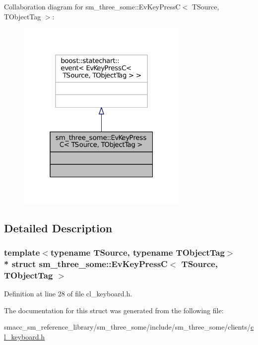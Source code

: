 Collaboration diagram for sm\+\_\+three\+\_\+some\+:\+:Ev\+Key\+PressC$<$ T\+Source, T\+Object\+Tag $>$\+:
\nopagebreak
\begin{figure}[H]
\begin{center}
\leavevmode
\includegraphics[width=235pt]{structsm__three__some_1_1EvKeyPressC__coll__graph}
\end{center}
\end{figure}


\subsection{Detailed Description}
\subsubsection*{template$<$typename T\+Source, typename T\+Object\+Tag$>$\\*
struct sm\+\_\+three\+\_\+some\+::\+Ev\+Key\+Press\+C$<$ T\+Source, T\+Object\+Tag $>$}



Definition at line 28 of file cl\+\_\+keyboard.\+h.



The documentation for this struct was generated from the following file\+:\begin{DoxyCompactItemize}
\item 
smacc\+\_\+sm\+\_\+reference\+\_\+library/sm\+\_\+three\+\_\+some/include/sm\+\_\+three\+\_\+some/clients/\hyperlink{cl__keyboard_8h}{cl\+\_\+keyboard.\+h}\end{DoxyCompactItemize}
